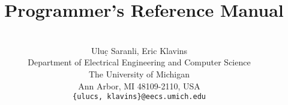 \documentclass[10pt, letterpaper]{book}
\begin{document}


\title{\bf {\Huge \rhexlib\ Programmer's Reference Manual}}
\author{
  \vspace{0.2in}\\
  {\Large Ulu\d{c} Saranli, Eric Klavins \vspace{0.3in} } \\
  Department of Electrical Engineering and Computer Science \\
  The University of Michigan \\
  Ann Arbor, MI 48109-2110, USA\\
  {\tt \{ulucs, klavins\}@eecs.umich.edu}}
\date{}
\maketitle


\thispagestyle{empty}




\newpage

\tableofcontents

\newpage
























\printindex
\end{document}
